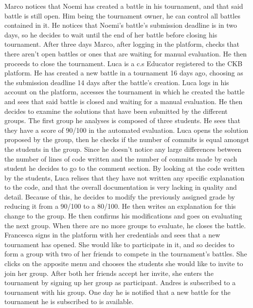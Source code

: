 \documentclass{article}
\newcounter{subsubsubsection}[subsubsection]
\begin{document}
{Marco notices that Noemi has created a battle in his tournament, and that said battle is still open.
Him being the tournament owner, he can control all battles contained in it. 
He notices that Noemi's battle's submission deadline is in two days, so he decides to wait until the end of her battle before closing his tournament.
After three days Marco, after logging in the platform, checks that there aren't open battles or ones that are waiting for manual evaluation. 
He then proceeds to close the tournament.
Luca is a c.s Educator registered to the CKB platform. 
He has created a new battle in a tournament 16 days ago, choosing as the submission deadline 14 days after the battle's creation.
Luca logs in his account on the platform, accesses the tournament in which he created the battle and sees that said battle is closed and waiting for a manual evaluation.
He then decides to examine the solutions that have been submitted by the different groups.
The first group he analyses is composed of three students. He sees that they have a score of 90/100 in the automated evaluation. 
Luca opens the solution proposed by the group, then he checks if the number of commits is equal amongst the students in the group.
Since he doesn't notice any large differences between the number of lines of code written and the number of commits made by each student he decides to go to the comment section.
By looking at the code written by the students, Luca relises that they have not written any specific explanation to the code, and that the overall documentation is very lacking 
in quality and detail. 
Because of this, he decides to modify the previously assigned grade by reducing it from a 90/100 to a 80/100.
He then writes an explanation for this change to the group. 
He then confirms his modifications and goes on evaluating the next group.
When there are no more groups to evaluate, he closes the battle.
Francesca signs in the platform with her credentials and sees that a new tournament has opened. 
She would like to participate in it, and so decides to form a group with two of her friends to compete in the tournament's battles. 
She clicks on the apposite menu and chooses the students she would like to invite to join her group.
After both her friends accept her invite, she enters the tournament by signing up her group as participant.
Andres is subscribed to a tournament with his group. One day he is notified that a new battle for the tournament he is subscribed to is available.
}
\end{document}

